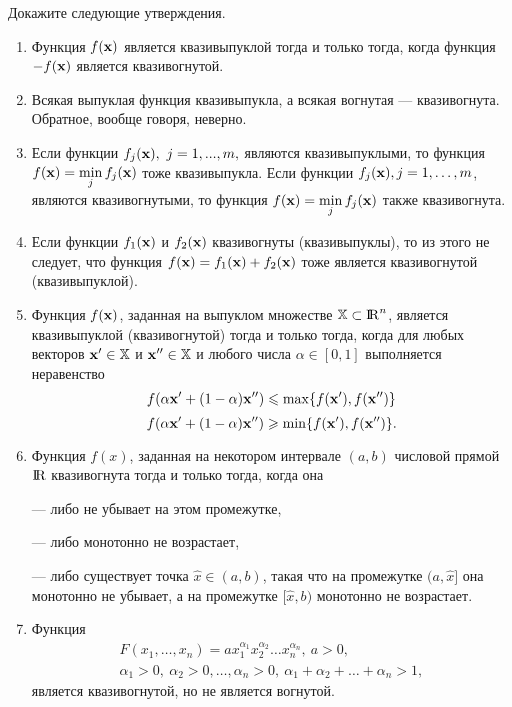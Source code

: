 \begin{exer}
Докажите следующие утверждения.


\begin{enumerate}
\renewcommand{\theenumi}{(\roman{enumi})}

  \item Функция $f(\mathbf{x})$ является квазивыпуклой
    тогда и только тогда, когда функция $-f(\mathbf{x})$ является
    квазивогнутой.

  \item Всякая выпуклая функция квазивыпукла, а всякая вогнутая ---
  квазивогнута. Обратное, вообще говоря, неверно.



  \item Если функции $f_{j}(\vc{x}), \ j=1,...,m,$ являются
  квазивыпуклыми, то функция
  $f(\mathbf{x})=\min\limits_{j}f_{j}(\mathbf{x})$
  тоже квазивыпукла.
  Если функции $f_j (\mathbf{x}), j=1, \ldots, m$, являются
  квазивогнутыми, то функция
  $f(\mathbf{x}) = \mathop {\min }\limits_j f_j(\mathbf{x})$ также квазивогнута.


  \item
  Если функции $f_{1}(\mathbf{x})$ и $f_{2}(\mathbf{x})$ квазивогнуты (квазивыпуклы), то
  из этого не следует, что функция
  $f(\mathbf{x})=f_{1}(\mathbf{x})+f_{2}(\mathbf{x})$
  тоже является квазивогнутой (квазивыпуклой).


  \item
  Функция $f(\mathbf{x})$, заданная на выпуклом множестве $\mathbb{X} \subset
  {\rm I\!R}^n$, является квазивыпуклой (квазивогнутой) тогда и только
  тогда, когда для любых векторов $\mathbf{x'}\in\mathbb{X}$ и
  $\mathbf{x''}\in\mathbb{X}$ и любого числа $\alpha\in[0,1]$ выполняется
  неравенство
\[
    f(\alpha\mathbf{x'}+(1-\alpha)\mathbf{x''})\leqslant\max\{f(\mathbf{x'}),f(\mathbf{x''})\}
\]
\[
    f(\alpha\mathbf{x'}+(1-\alpha)\mathbf{x''})\geqslant\min\{f(\mathbf{x'}),f(\mathbf{x''})\}.
\]

    \item
    Функция $f(x)$, заданная на некотором интервале $(a,b)$ числовой прямой
    ${\rm I\!R}$ квазивогнута тогда и только тогда, когда она

    --- либо не убывает на этом промежутке,

    --- либо монотонно не возрастает,

    --- либо существует точка $\hat{x}\in(a,b)$, такая что на
    промежутке $(a,\hat{x}]$ она монотонно не убывает, а на
    промежутке $[\hat{x},b)$ монотонно не возрастает.

    \item Функция
\begin{multline*}
    F(x_{1},\ldots,x_{n})=ax_{1}^{\alpha_{1}}x_{2}^{\alpha_{2}}\ldots x_{n}^{\alpha_{n}}, \ a>0, \\
    \alpha_{1}>0, \ \alpha_{2}>0, \ldots, \alpha_{n}>0, \
    \alpha_{1}+\alpha_{2}+\ldots+\alpha_{n}>1,
\end{multline*}
    является квазивогнутой, но не является вогнутой.


\end{enumerate}


\end{exer}





